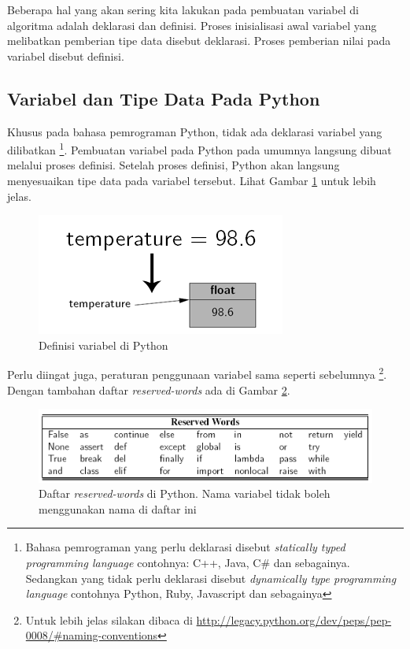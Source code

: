 Beberapa hal yang akan sering kita lakukan pada pembuatan variabel di algoritma adalah deklarasi dan definisi. Proses inisialisasi awal variabel yang melibatkan pemberian tipe data disebut deklarasi. Proses pemberian nilai pada variabel disebut definisi.


\subsection{Variabel dan Tipe Data Pada Python}
Khusus pada bahasa pemrograman Python, tidak ada deklarasi variabel yang dilibatkan \footnote{Bahasa pemrograman yang perlu deklarasi disebut \textit{statically typed programming language} contohnya: C++, Java, C\# dan sebagainya. Sedangkan yang tidak perlu deklarasi disebut \textit{dynamically type programming language} contohnya Python, Ruby, Javascript dan sebagainya}. Pembuatan variabel pada Python pada umumnya langsung dibuat melalui proses definisi. Setelah proses definisi, Python akan langsung menyesuaikan tipe data pada variabel tersebut. Lihat Gambar \ref{fig:definisiVar} untuk lebih jelas. 
	\begin{figure}
		\centering
		\includegraphics[scale=0.75]{fig/1/definisiVar.png}
		\caption{Definisi variabel di Python}
		\label{fig:definisiVar}
	\end{figure}

Perlu diingat juga, peraturan penggunaan variabel sama seperti sebelumnya \footnote{Untuk lebih jelas silakan dibaca di \url{http://legacy.python.org/dev/peps/pep-0008/\#naming-conventions}}. Dengan tambahan daftar \textit{reserved-words} ada di Gambar \ref{fig:reservedWords}.
		\begin{figure}
		\centering
		\includegraphics[scale=0.4]{fig/1/Gambar17.png}
		\caption{Daftar \textit{reserved-words} di Python. Nama variabel tidak boleh menggunakan nama di daftar ini}
		\label{fig:reservedWords}
		\end{figure}


